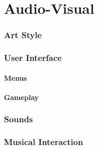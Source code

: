 \documentclass[a4paper]{report}
\begin{document}
\part{Audio-Visual}
\section{Art Style}
 
\section{User Interface}
\subsection{Menus}
 
\subsection{Gameplay}
 
\section{Sounds}
 
\section{Musical Interaction}
 
\end{document}

